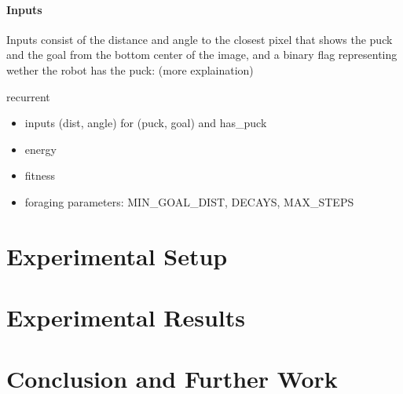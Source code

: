\documentclass{article}
\begin{document}
	\paragraph{Inputs} %
	\label{par:Inputs}
	Inputs consist of the distance and angle to the closest pixel that shows
	the puck and the goal from the bottom center of the image, and a binary
	flag representing wether the robot has the puck:
	(more explaination)

	recurrent

	\begin{itemize}
		\item inputs (dist, angle) for (puck, goal) and has\_puck
		\item energy
		\item fitness
		\item foraging parameters: MIN\_GOAL\_DIST, DECAYS, MAX\_STEPS
	\end{itemize}

	\section{Experimental Setup} %
	\label{sec:setup}


	\section{Experimental Results} %
	\label{sec:results}
	

	\section{Conclusion and Further Work} %
	\label{sec:conclusion}
	


\end{document}
